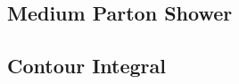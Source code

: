 \documentclass[12pt]{article}
\begin{document}
\newpage


\subsection{Medium Parton Shower}

\begin{center}
	


\end{center}



\subsection{Contour Integral}

\begin{center}



\end{center}
\end{document}
